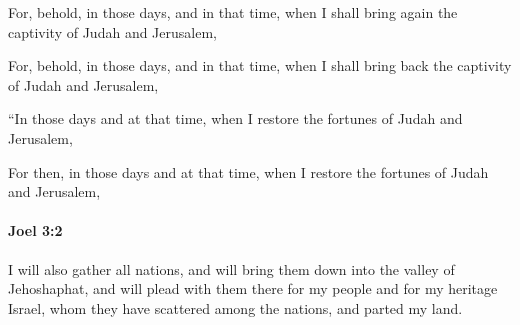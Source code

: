 			For, behold, in those days, and in that time, when I shall bring again the captivity of Judah and Jerusalem,

			\begin{versebox}
					\item[BHS] 
					\item[LXX] 
					\item[ASV] For, behold, in those days, and in that time, when I shall bring back the captivity of Judah and Jerusalem,
					\item[NIV] “In those days and at that time, when I restore the fortunes of Judah and Jerusalem,
					\item[NRSV] For then, in those days and at that time, when I restore the fortunes of Judah and Jerusalem,
			\end{versebox}

		\paragraph{Joel 3:2} %
			\label{JOEL-3-2}

			I will also gather all nations, and will bring them down into the valley of Jehoshaphat, and will plead with them there for my people and for my heritage Israel, whom they have scattered among the nations, and parted my land.

